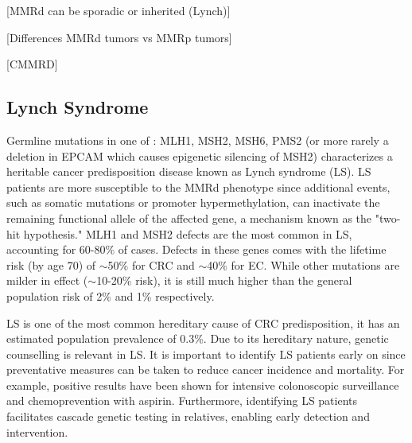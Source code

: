\documentclass[fleqn,10pt]{olplainarticle}
\begin{document}
[MMRd can be sporadic or inherited (Lynch)]

[Differences MMRd tumors vs MMRp tumors]

[CMMRD]


\subsection{Lynch Syndrome}

Germline mutations in one of : MLH1, MSH2, MSH6, PMS2 (or more rarely a deletion in EPCAM which causes epigenetic silencing of MSH2) characterizes a heritable cancer predisposition disease known as Lynch syndrome (LS). LS patients are more susceptible to the MMRd phenotype since additional events, such as somatic mutations or promoter hypermethylation, can inactivate the remaining functional allele of the affected gene, a mechanism known as the "two-hit hypothesis." MLH1 and MSH2 defects are the most common in LS, accounting for 60-80\% of cases. Defects in these genes comes with the lifetime risk (by age 70) of $\sim$50\% for CRC and $\sim$40\% for EC. While other mutations are milder in effect ($\sim$10-20\% risk), it is still much higher than the general population risk of 2\% and 1\% respectively. 

LS is one of the most common hereditary cause of CRC predisposition, it has an estimated population prevalence of 0.3\%. Due to its hereditary nature, genetic counselling is relevant in LS. It is important to identify LS patients early on since preventative measures can be taken to reduce cancer incidence and mortality. For example, positive results have been shown for intensive colonoscopic surveillance and chemoprevention with aspirin. Furthermore, identifying LS patients facilitates cascade genetic testing in relatives, enabling early detection and intervention.
\end{document}
